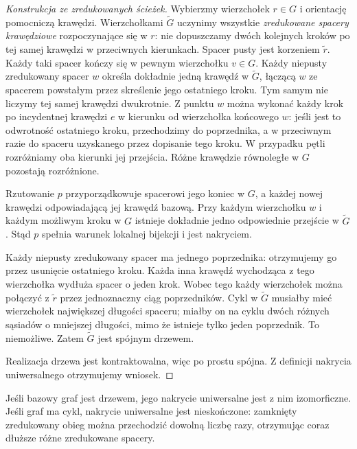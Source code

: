\begin{proof}[Konstrukcja ze zredukowanych ścieżek]
Wybierzmy wierzchołek $r\in G$ i orientację pomocniczą
krawędzi. Wierzchołkami $\widetilde G$ uczynimy wszystkie
\emph{zredukowane spacery krawędziowe} rozpoczynające się w $r$:
nie dopuszczamy dwóch kolejnych kroków po tej samej krawędzi
w przeciwnych kierunkach. Spacer pusty jest korzeniem $\widetilde r$.
Każdy taki spacer kończy się w pewnym wierzchołku $v\in G$.
Każdy niepusty zredukowany spacer $w$ określa dokładnie
jedną krawędź w $\widetilde G$, łączącą $w$ ze spacerem
powstałym przez skreślenie jego ostatniego kroku.
Tym samym nie liczymy tej samej krawędzi dwukrotnie.
Z punktu $w$ można wykonać każdy krok po incydentnej
krawędzi $e$ w kierunku od wierzchołka końcowego $w$:
jeśli jest to odwrotność ostatniego kroku,
przechodzimy do poprzednika, a w przeciwnym razie
do spaceru uzyskanego przez dopisanie tego kroku.
W przypadku pętli rozróżniamy oba kierunki jej przejścia.
Różne krawędzie równoległe w $G$ pozostają rozróżnione.

Rzutowanie $p$ przyporządkowuje spacerowi jego koniec w $G$,
a każdej nowej krawędzi odpowiadającą jej krawędź bazową.
Przy każdym wierzchołku $w$ i każdym możliwym kroku w $G$
istnieje dokładnie jedno odpowiednie przejście w $\widetilde G$.
Stąd $p$ spełnia warunek lokalnej bijekcji i jest nakryciem.

Każdy niepusty zredukowany spacer ma jednego poprzednika:
otrzymujemy go przez usunięcie ostatniego kroku.
Każda inna krawędź wychodząca z tego wierzchołka wydłuża
spacer o jeden krok. Wobec tego każdy wierzchołek można
połączyć z $\widetilde r$ przez jednoznaczny ciąg poprzedników.
Cykl w $\widetilde G$ musiałby mieć wierzchołek największej
długości spaceru; miałby on na cyklu dwóch różnych sąsiadów
o mniejszej długości, mimo że istnieje tylko jeden poprzednik.
To niemożliwe. Zatem $\widetilde G$ jest spójnym drzewem.

Realizacja drzewa jest kontraktowalna, więc po prostu spójna.
Z definicji nakrycia uniwersalnego otrzymujemy wniosek.
\end{proof}

\begin{uwaga}
Jeśli bazowy graf jest drzewem, jego nakrycie uniwersalne
jest z nim izomorficzne. Jeśli graf ma cykl, nakrycie
uniwersalne jest nieskończone: zamknięty zredukowany obieg
można przechodzić dowolną liczbę razy, otrzymując
coraz dłuższe różne zredukowane spacery.
\end{uwaga}

